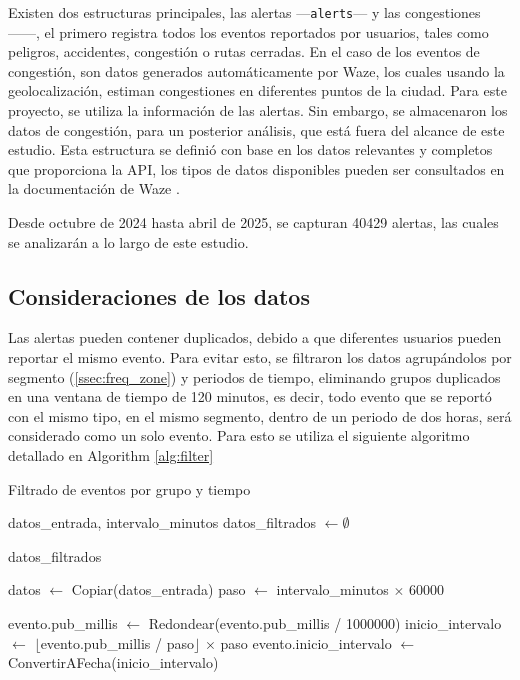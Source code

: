 \documentclass[12pt]{article}
\begin{document}
{Existen dos estructuras principales, las alertas —\texttt{alerts}— y las congestiones ——, el primero registra todos los eventos reportados por usuarios, tales como peligros, accidentes, congestión o rutas cerradas. En el caso de los eventos de congestión, son datos generados automáticamente por Waze, los cuales usando la geolocalización, estiman congestiones en diferentes puntos de la ciudad. Para este proyecto, se utiliza la información de las alertas. Sin embargo, se almacenaron los datos de congestión, para un posterior análisis, que está fuera del alcance de este estudio. Esta estructura se definió con base en los datos relevantes y completos que proporciona la API, los tipos de datos disponibles pueden ser consultados en la documentación de Waze \citep{waze2024}.

Desde octubre de 2024 hasta abril de 2025, se capturan 40429 alertas, las cuales se analizarán a lo largo de este estudio.

\subsection{Consideraciones de los datos}

Las alertas pueden contener duplicados, debido a que diferentes usuarios pueden reportar el mismo evento. Para evitar esto, se filtraron los datos agrupándolos por segmento (\cref{ssec:freq_zone}) y periodos de tiempo, eliminando grupos duplicados en una ventana de tiempo de 120 minutos, es decir, todo evento que se reportó con el mismo tipo, en el mismo segmento, dentro de un periodo de dos horas, será considerado como un solo evento. Para esto se utiliza el siguiente algoritmo detallado en Algorithm \cref{alg:filter}

\begin{algorithm}
\caption{Filtrado de eventos por grupo y tiempo}
\label{alg:filter}
\begin{algorithmic}[1]
\Require datos\_entrada, intervalo\_minutos
\State datos\_filtrados $\gets \emptyset$

    \Return datos\_filtrados
\EndIf

\State datos $\gets$ Copiar(datos\_entrada)
\State paso $\gets$ intervalo\_minutos $\times$ 60000 

        \State evento.pub\_millis $\gets$ Redondear(evento.pub\_millis / 1000000)
    \EndIf
    \State inicio\_intervalo $\gets$ $\lfloor$evento.pub\_millis / paso$\rfloor$ $\times$ paso
    \State evento.inicio\_intervalo $\gets$ ConvertirAFecha(inicio\_intervalo)
\EndFor


\end{algorithmic}
\end{algorithm}}
\end{document}
